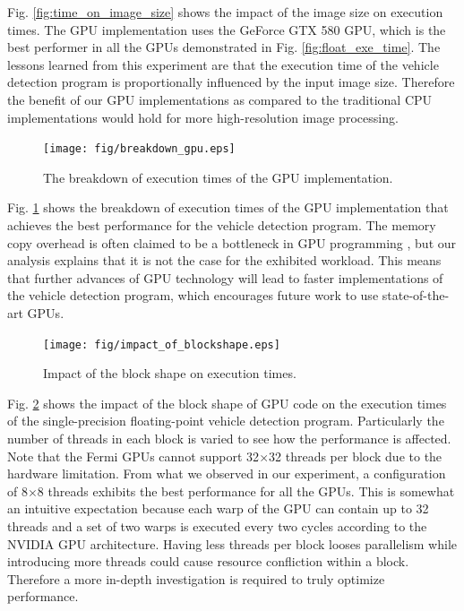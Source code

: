 Fig. \ref{fig:time_on_image_size} shows the impact of the image size on
execution times. 
The GPU implementation uses the GeForce GTX 580 GPU, which is the best
performer in all the GPUs demonstrated in Fig. \ref{fig:float_exe_time}.
The lessons learned from this experiment are that the execution time of
the vehicle detection program is proportionally influenced by the input
image size.
Therefore the benefit of our GPU implementations as compared to the
traditional CPU implementations would hold for more high-resolution
image processing.

\begin{figure}[t]
 \begin{center}
  \texttt{[image: fig/breakdown\_gpu.eps]}\\
  \caption{The breakdown of execution times of the GPU implementation.}
  \label{fig:breakdown_gpu}
 \end{center}
\end{figure}

Fig. \ref{fig:breakdown_gpu} shows the breakdown of execution times of
the GPU implementation that achieves the best performance for the
vehicle detection program.
The memory copy overhead is often claimed to be a bottleneck in GPU
programming \cite{Jablin_PLDI11}, but our analysis explains that it is
not the case for the exhibited workload.
This means that further advances of GPU technology will lead to faster
implementations of the vehicle detection program, which encourages
future work to use state-of-the-art GPUs.

\begin{figure}[t]
 \begin{center}
  \texttt{[image: fig/impact\_of\_blockshape.eps]}\\
  \caption{Impact of the block shape on execution times.}
  \label{fig:impact_of_blockshape}
 \end{center}
\end{figure}

Fig. \ref{fig:impact_of_blockshape} shows the impact of the block shape
of GPU code on the execution times of the single-precision
floating-point vehicle detection program.
Particularly the number of threads in each block is varied to see how
the performance is affected.
Note that the Fermi GPUs cannot support 32$\times$32 threads per block
due to the hardware limitation.
From what we observed in our experiment, a configuration of 8$\times$8
threads exhibits the best performance for all the GPUs.
This is somewhat an intuitive expectation because each warp of the GPU
can contain up to 32 threads and a set of two warps is executed every
two cycles according to the NVIDIA GPU architecture.
Having less threads per block looses parallelism while introducing more
threads could cause resource confliction within a block.
Therefore a more in-depth investigation is required to truly optimize
performance.
